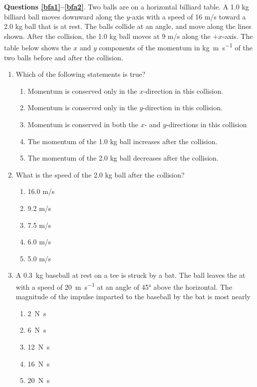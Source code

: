 \documentclass{../../../oss-classkick}
\begin{document}
\begin{multicols}{2}
  \textbf{Questions \ref{bfa1}--\ref{bfa2}}. Two balls are on a horizontal
  billiard table. A 1.0 kg billiard ball moves downward along the $y$-axis with
  a speed of 16 m/s toward a 2.0 kg ball that is at rest. The balls collide at
  an angle, and move along the lines shown. After the collision, the 1.0 kg
  ball moves at 9 m/s along the $+x$-axis. The table below shows the $x$ and
  $y$ components of the momentum in \si{\kilo\gram\metre\per\second} of the two
  balls before and after the collision.
  \begin{enumerate}[leftmargin=18pt,resume]
  \item Which of the following statements is true?
    \label{bfa1}
    \begin{enumerate}[nosep,leftmargin=18pt,label=(\Alph*)]    
    \item Momentum is conserved only in the $x$-direction in this collision.
    \item Momentum is conserved only in the $y$-direction in this collision.
    \item Momentum is conserved in both the $x$- and $y$-directions in this
      collision
    \item The momentum of the 1.0 kg ball increases after the collision.
    \item The momentum of the 2.0 kg ball decreases after the collision.
    \end{enumerate}
    \vspace{.7in}
    
  \item What is the speed of the 2.0 kg ball after the collision?
    \label{bfa2}
    \begin{enumerate}[nosep,leftmargin=18pt,label=(\Alph*)]
    \item 16.0 m/s
    \item 9.2 m/s
    \item 7.5 m/s
    \item 6.0 m/s
    \item 5.0 m/s
    \end{enumerate}
    \columnbreak
    
  \item A \SI{.3}{\kilo\gram} baseball at rest on a tee is struck by a bat. The
    ball leaves the at with a speed of \SI{20}{\metre\per\second} at an angle
    of \ang{45} above the horizontal. The magnitude of the impulse imparted to
    the baseball by the bat is most nearly
    \begin{enumerate}[nosep,leftmargin=18pt,label=(\Alph*)]
    \item\SI{2}{\newton\second}
    \item\SI{6}{\newton\second}
    \item\SI{12}{\newton\second}
    \item\SI{16}{\newton\second}
    \item\SI{20}{\newton\second}
    \end{enumerate}
    

\end{enumerate}
\end{multicols}
\end{document}
